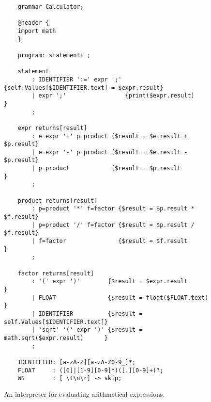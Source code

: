 \begin{figure}[!ht]
\centering
\begin{verbatim}
    grammar Calculator;
    
    @header {
    import math
    }
    
    program: statement+ ; 
    
    statement
        : IDENTIFIER ':=' expr ';' {self.Values[$IDENTIFIER.text] = $expr.result}
        | expr ';'                 {print($expr.result)                         }
        ;
    
    expr returns[result]
        : e=expr '+' p=product {$result = $e.result + $p.result}
        | e=expr '-' p=product {$result = $e.result - $p.result}
        | p=product            {$result = $p.result            }
        ;
    
    product returns[result]
        : p=product '*' f=factor {$result = $p.result * $f.result}
        | p=product '/' f=factor {$result = $p.result / $f.result}
        | f=factor               {$result = $f.result            }
        ;
    
    factor returns[result]
        : '(' expr ')'        {$result = $expr.result                 }
        | FLOAT               {$result = float($FLOAT.text)           }
        | IDENTIFIER          {$result = self.Values[$IDENTIFIER.text]}
        | 'sqrt' '(' expr ')' {$result = math.sqrt($expr.result)      }
        ;
    
    IDENTIFIER: [a-zA-Z][a-zA-Z0-9_]*;
    FLOAT     : ([0]|[1-9][0-9]*)([.][0-9]+)?;
    WS        : [ \t\n\r] -> skip; 
\end{verbatim}
\vspace*{-0.3cm}
\caption{An interpreter for evaluating arithmetical expressions.}
\label{fig:Calculator.g4}
\end{figure}

